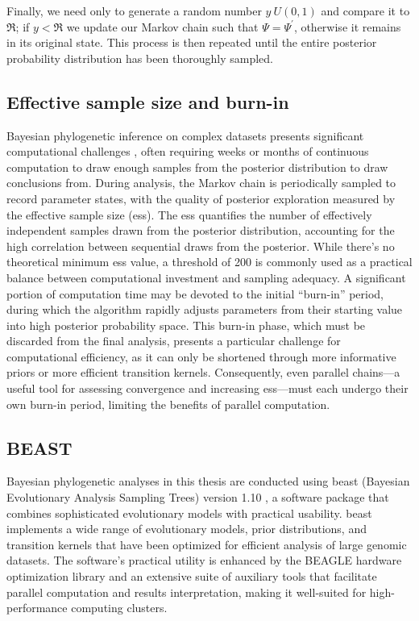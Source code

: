 Finally, we need only to generate a random number $y~U(0,1)$ and compare it to $\mathfrak{R}$; if $y < \mathfrak{R}$ we update our Markov chain such that $\Psi = \Psi^{\prime}$, otherwise it remains in its original state.
This process is then repeated until the entire posterior probability distribution has been thoroughly sampled.

\subsection{Effective sample size and burn-in}

Bayesian phylogenetic inference on complex datasets presents significant computational challenges \citep{suchard2009many-core}, often requiring weeks or months of continuous computation to draw enough samples from the posterior distribution to draw conclusions from.
During analysis, the Markov chain is periodically sampled to record parameter states, with the quality of posterior exploration measured by the effective sample size (\gls{ess}).
The \gls{ess} \citep{lanfear2016estimating} quantifies the number of effectively independent samples drawn from the posterior distribution, accounting for the high correlation between sequential draws from the posterior.
While there's no theoretical minimum \gls{ess} value, a threshold of 200 is commonly used as a practical balance between computational investment and sampling adequacy.
A significant portion of computation time may be devoted to the initial ``burn-in'' period, during which the algorithm rapidly adjusts parameters from their starting value into high posterior probability space.
This burn-in phase, which must be discarded from the final analysis, presents a particular challenge for computational efficiency, as it can only be shortened through more informative priors or more efficient transition kernels.
Consequently, even parallel chains---a useful tool for assessing convergence and increasing \gls{ess}---must each undergo their own burn-in period, limiting the benefits of parallel computation.


\subsection{BEAST}
Bayesian phylogenetic analyses in this thesis are conducted using \gls{beast} (Bayesian Evolutionary Analysis Sampling Trees) version 1.10 \citep{suchard2018bayesian}, a software package that combines sophisticated evolutionary models with practical usability.
\gls{beast} implements a wide range of evolutionary models, prior distributions, and transition kernels that have been optimized for efficient analysis of large genomic datasets. 
The software's practical utility is enhanced by the BEAGLE \citep{ayres2019beagle} hardware optimization library and an extensive suite of auxiliary tools that facilitate parallel computation and results interpretation, making it well-suited for high-performance computing clusters.

